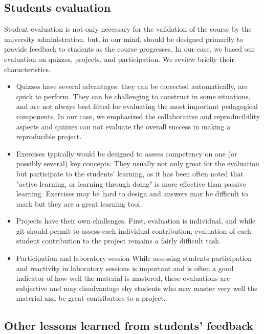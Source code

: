 \subsection*{Students evaluation}
Student evaluation is not only necessary for the validation of the course by
the university administration, but, in our mind, should be designed primarily
to provide feedback to students as the course progresses. In our case, we
based our evaluation on quizzes, projects, and participation. We review
briefly their characteristics.
\begin{itemize}

\item Quizzes have several advantages: they can be corrected automatically, are
quick to perform. They can be challenging to construct in some situations, and
are not always best fitted for evaluating the most important pedagogical
components. In our case, we emphasized the collaborative and reproducibility
aspects and quizzes can not evaluate the overall success in making a
reproducible project.

\item Exercises typically would be designed to assess competency on one (or
possibly several) key concepts. They usually not only great for the evaluation
but participate to the students' learning, as it has been often noted that
"active learning, or learning through doing" is more effective than passive
learning. Exercises may be hard to design and answers may be difficult to mark
but they are a great learning tool. 

\item Projects have their own challenges. First, evaluation is
individual, and while git should permit to assess each individual contribution,
evaluation of each student contribution to the project remains a fairly
difficult task. 

\item Participation and laboratory session
While assessing students participation and reactivity in laboratory sessions is
important and is often a good indicator of how well the material is mastered,
these evaluations are subjective and may disadvantage shy students who may
master very well the material and be great contributors to a project.  

\end{itemize}

\subsection*{Other lessons learned from students' feedback}

